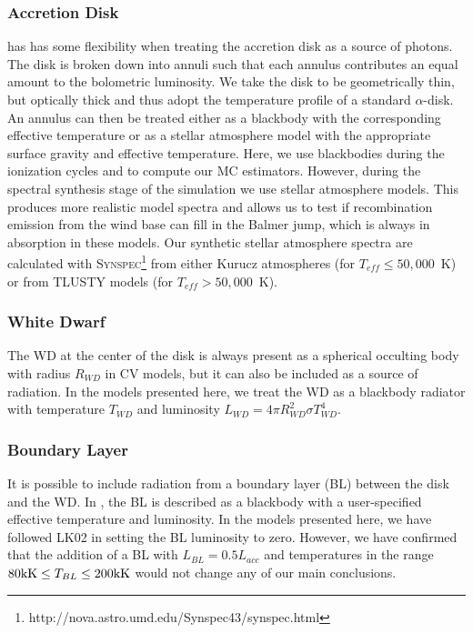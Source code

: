\documentclass[preprint, a4paper, 11pt]{aastex}
\begin{document}
\subsubsection{Accretion Disk}

\py has has some flexibility when treating the accretion 
disk as a source of photons. The disk is broken down into annuli 
such that each annulus contributes an equal amount to the bolometric
luminosity. We take the disk to be geometrically thin, but optically
thick and thus adopt the temperature profile of a standard
\cite{shakurasunyaev1973} $\alpha$-disk. An annulus can then
be treated either as a blackbody with the corresponding effective
temperature or as a stellar atmosphere model with the appropriate
surface gravity and effective temperature. Here, we use blackbodies 
during the ionization cycles and to compute our MC
estimators. However, during the spectral synthesis stage of the 
simulation we use stellar atmosphere models. This produces more
realistic model spectra and allows us to test if recombination
emission from the wind base can fill in the Balmer jump, which is
always in absorption in these models. Our synthetic stellar atmosphere
spectra are calculated with
\textsc{Synspec}\footnote{http://nova.astro.umd.edu/Synspec43/synspec.html}
from either Kurucz \citep{kurucz1991} atmospheres (for $T_{eff} \leq
50,000$~K) or from \textsc{TLUSTY} models \citep{tlusty} (for $T_{eff} > 50,000$~K). 

\subsubsection{White Dwarf}

The WD at the center of the disk is always present as a spherical occulting
body with radius $R_{WD}$ in \py CV models, but it can also be included
as a source of radiation. In the models presented here, we treat the
WD as a blackbody radiator with temperature $T_{WD}$ and luminosity
$L_{WD} = 4\pi R_{WD}^2 \sigma T_{WD}^4$. 

\subsubsection{Boundary Layer}

It is possible to include radiation from a boundary layer (BL) between
the disk and the WD. In \py, the BL is described as
a blackbody with a user-specified effective temperature and
luminosity. In the models presented here, we have followed LK02 in setting
the BL luminosity to zero. However, we have confirmed that the addition of a
BL with $L_{BL} = 0.5 L_{acc}$ and temperatures in the range $80{\rm
kK} \leq T_{BL} \leq 200{\rm kK}$ would not change any of our main
conclusions. 
\end{document}
